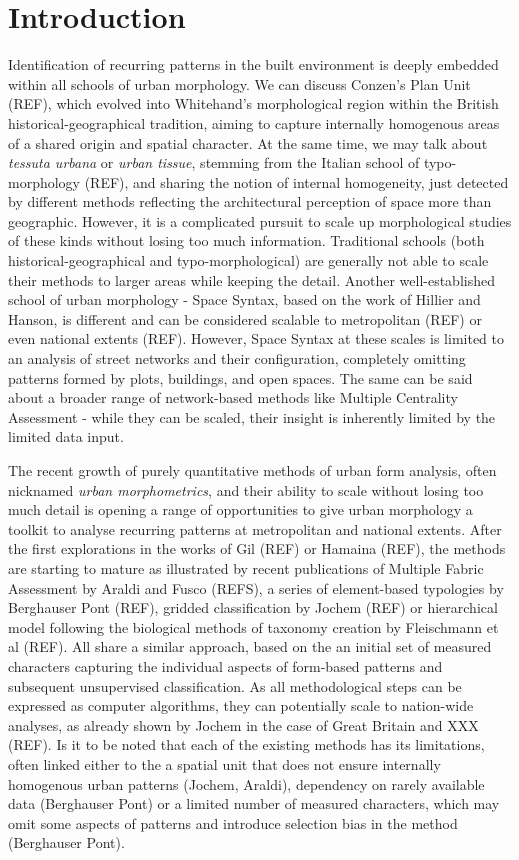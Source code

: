 \section{Introduction}
\label{sec:intro}

Identification of recurring patterns in the built environment is deeply embedded within
all schools of urban morphology. We can discuss Conzen's Plan Unit (REF), which evolved
into Whitehand's morphological region within the British historical-geographical
tradition, aiming to capture internally homogenous areas of a shared origin and spatial
character. At the same time, we may talk about \textit{tessuta urbana} or \textit{urban
tissue}, stemming from the Italian school of typo-morphology (REF), and sharing the
notion of internal homogeneity, just detected by different methods reflecting the
architectural perception of space more than geographic. However, it is a complicated
pursuit to scale up morphological studies of these kinds without losing too much
information. Traditional schools (both historical-geographical and typo-morphological)
are generally not able to scale their methods to larger areas while keeping the detail.
Another well-established school of urban morphology - Space Syntax, based on the work of
Hillier and Hanson, is different and can be considered scalable to metropolitan (REF) or
even national extents (REF). However, Space Syntax at these scales is limited to an
analysis of street networks and their configuration, completely omitting patterns formed
by plots, buildings, and open spaces. The same can be said about a broader range of
network-based methods like Multiple Centrality Assessment - while they can be scaled,
their insight is inherently limited by the limited data input.

The recent growth of purely quantitative methods of urban form analysis, often nicknamed
\textit{urban morphometrics}, and their ability to scale without losing too much detail
is opening a range of opportunities to give urban morphology a toolkit to analyse
recurring patterns at metropolitan and national extents. After the first explorations in
the works of Gil (REF) or Hamaina (REF), the methods are starting to mature as
illustrated by recent publications of Multiple Fabric Assessment by Araldi and Fusco
(REFS), a series of element-based typologies by Berghauser Pont (REF), gridded
classification by Jochem (REF) or hierarchical model following the biological methods of
taxonomy creation by Fleischmann et al (REF). All share a similar approach, based on the
an initial set of measured characters capturing the individual aspects of form-based
patterns and subsequent unsupervised classification. As all methodological steps can be
expressed as computer algorithms, they can potentially scale to nation-wide analyses, as
already shown by Jochem in the case of Great Britain and XXX (REF). Is it to be noted
that each of the existing methods has its limitations, often linked either to the a
spatial unit that does not ensure internally homogenous urban patterns (Jochem, Araldi),
dependency on rarely available data (Berghauser Pont) or a limited number of measured
characters, which may omit some aspects of patterns and introduce selection bias in the
method (Berghauser Pont).

